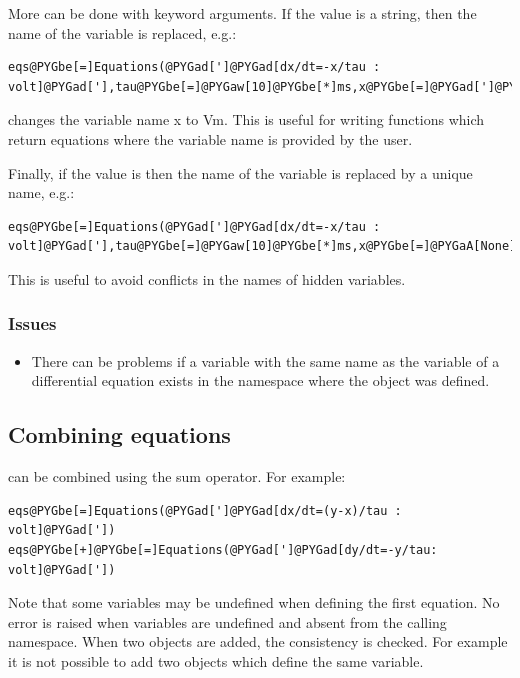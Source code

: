 \documentclass[letterpaper,10pt]{manual}
\begin{document}
More can be done with keyword arguments. If the value is a string, then the name of the
variable is replaced, e.g.:

\begin{Verbatim}[commandchars=@\[\]]
eqs@PYGbe[=]Equations(@PYGad[']@PYGad[dx/dt=-x/tau : volt]@PYGad['],tau@PYGbe[=]@PYGaw[10]@PYGbe[*]ms,x@PYGbe[=]@PYGad[']@PYGad[Vm]@PYGad['])
\end{Verbatim}

changes the variable name x to Vm. This is useful for writing functions which return
equations where the variable name is provided by the user.

Finally, if the value is  then the name of the variable is replaced by a unique
name, e.g.:

\begin{Verbatim}[commandchars=@\[\]]
eqs@PYGbe[=]Equations(@PYGad[']@PYGad[dx/dt=-x/tau : volt]@PYGad['],tau@PYGbe[=]@PYGaw[10]@PYGbe[*]ms,x@PYGbe[=]@PYGaA[None])
\end{Verbatim}

This is useful to avoid conflicts in the names of hidden variables.


\subsubsection{Issues}
\begin{itemize}
\item {} 
There can be problems if a variable with the same name as the variable of a
differential equation exists in the namespace where the \hyperlink{brian.Equations}{} object was defined.

\end{itemize}

\subsection{Combining equations}

\hyperlink{brian.Equations}{} can be combined using the sum operator. For example:

\begin{Verbatim}[commandchars=@\[\]]
eqs@PYGbe[=]Equations(@PYGad[']@PYGad[dx/dt=(y-x)/tau : volt]@PYGad['])
eqs@PYGbe[+]@PYGbe[=]Equations(@PYGad[']@PYGad[dy/dt=-y/tau: volt]@PYGad['])
\end{Verbatim}

Note that some variables may be undefined when defining the first equation. No error is
raised when variables are undefined and absent from the calling namespace.
When two \hyperlink{brian.Equations}{} objects are added, the consistency is checked. For example it is not
possible to add two \hyperlink{brian.Equations}{} objects which define the same variable.
\end{document}
